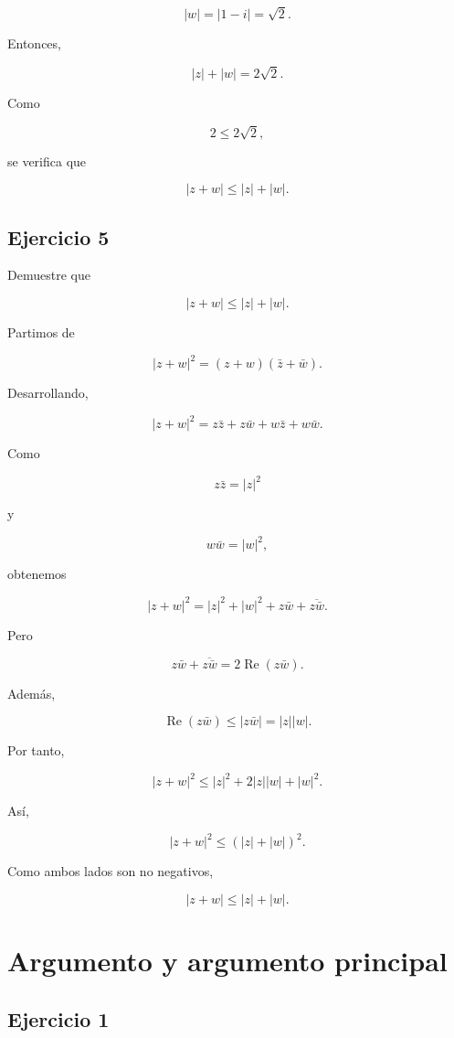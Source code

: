 \documentclass[12pt]{article}
\begin{document}
\[
|w|
=
|1-i|
=
\sqrt2.
\]

Entonces,

\[
|z|+|w|=2\sqrt2.
\]

Como

\[
2\leq2\sqrt2,
\]

se verifica que

\[
\boxed{
|z+w|\leq|z|+|w|
}.
\]


\subsection*{Ejercicio 5}

Demuestre que

\[
|z+w|\leq|z|+|w|.
\]

Partimos de

\[
|z+w|^2
=
(z+w)(\bar z+\bar w).
\]

Desarrollando,

\[
|z+w|^2
=
z\bar z+z\bar w+w\bar z+w\bar w.
\]

Como

\[
z\bar z=|z|^2
\]

y

\[
w\bar w=|w|^2,
\]

obtenemos

\[
|z+w|^2
=
|z|^2+|w|^2+
z\bar w+\overline{z\bar w}.
\]

Pero

\[
z\bar w+\overline{z\bar w}
=
2\operatorname{Re}(z\bar w).
\]

Además,

\[
\operatorname{Re}(z\bar w)
\leq
|z\bar w|
=
|z||w|.
\]

Por tanto,

\[
|z+w|^2
\leq
|z|^2+2|z||w|+|w|^2.
\]

Así,

\[
|z+w|^2
\leq
(|z|+|w|)^2.
\]

Como ambos lados son no negativos,

\[
\boxed{
|z+w|\leq|z|+|w|
}.
\]

\section*{Argumento y argumento principal}

\subsection*{Ejercicio 1}
\end{document}
